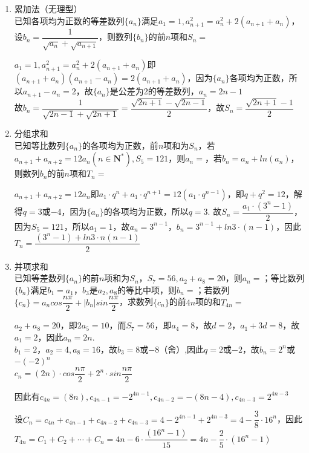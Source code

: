 \begin{enumerate}
    \item 累加法（无理型） \\
    已知各项均为正数的等差数列$\{a_n\}$满足$a_1 = 1, a_{n+1}^2 = a_n^2+2(a_{n+1} + a_n)$，设$b_n = \dfrac{1}{\sqrt{a_n} + \sqrt{a_{n+1}}}$，则数列$\{b_n\}$的前$n$项和$S_n = $
    \begin{jieda}
        $a_1 = 1, a_{n+1}^2 = a_n^2+2(a_{n+1} + a_n)$即$(a_{n+1} + a_n)(a_{n+1} - a_n) = 2(a_{n+1} + a_n)$，因为$\{a_n\}$各项均为正数，所以$a_{n+1} - a_n = 2$，故$\{a_n\}$是公差为2的等差数列，$a_n = 2n-1$ \\
        故$b_n = \dfrac{1}{\sqrt{2n-1} + \sqrt{2n+1}} = \dfrac{\sqrt{2n+1} - \sqrt{2n-1}}{2}$，故$S_n = \dfrac{\sqrt{2n+1} - 1}{2}$
    \end{jieda}
    
    \item 分组求和\\
    已知等比数列$\{a_n\}$的各项均为正数，前$n$项和为$S_n$，若$a_{n+1} + a_{n+2} = 12a_n(n \in \mathbf{N^*}), S_5 = 121$，则$a_n = $，若$b_n = a_n + ln (a_n)$，则数列$b_n$的前$n$项和$T_n = $
    \begin{jieda}
        $a_{n+1} + a_{n+2} = 12a_n$即$a_1 \cdot q^n + a_1 \cdot q^{n+1} = 12(a_1 \cdot q^{n-1})$，即$q + q^2 = 12$，解得$q = 3$或$-4$，因为$\{a_n\}$的各项均为正数，所以$q = 3$. 故$S_n = \dfrac{a_1 \cdot (3^n - 1)}{2}$，因为$S_5 = 121$，所以$a_1 = 1$，故$a_n = 3^{n-1}$，$b_n = 3^{n-1} + ln3 \cdot (n-1)$，因此$T_n = \dfrac{(3^n - 1) + ln3 \cdot n(n-1)}{2}$
    \end{jieda}
    \item 并项求和 \\
    已知等差数列$\{a_n\}$的前$n$项和为$S_n$，$S_7 = 56, a_2 + a_8 = 20$，则$a_n = $；等比数列$\{b_n\}$满足$b_1 = a_1$，$b_3$是$a_2, a_8$的等比中项，则$b_n = $；若数列$\{c_n\} = a_n cos\dfrac{n\pi}{2} + |b_n|sin\dfrac{n\pi}{2}$，求数列$\{c_n\}$的前$4n$项的和$T_{4n} = $
    \begin{jieda}
        $a_2 + a_8 = 20$，即$2a_5 = 10$，而$S_7 = 56$，即$a_4=8$，故$d = 2$，$a_1 + 3d = 8$，故$a_1 = 2$，因此$a_n = 2n$. \\
        $b_1 = 2$，$a_2 = 4, a_8 = 16$，故$b_3 = 8$或$-8$（舍）,因此$q = 2$或$-2$，故$b_n = 2^n$或$-(-2)^n$ \\
        $c_n = (2n) \cdot cos\dfrac{n\pi}{2} + 2^n \cdot sin\dfrac{n\pi}{2}$
        
        因此有$c_{4n} = (8n), c_{4n-1} = -2^{4n-1}, c_{4n-2} = -(8n-4), c_{4n-3} = 2^{4n-3}$
        
        设$C_n = c_{4n} + c_{4n-1} + c_{4n-2} + c_{4n-3} = 4 - 2^{4n-1} + 2^{4n-3} = 4 - \dfrac{3}{8} \cdot 16^n$，因此$T_{4n} = C_1 + C_2 + \cdots + C_n = 4n - 6 \cdot \dfrac{(16^n - 1)}{15} = 4n - \dfrac{2}{5} \cdot (16^n - 1)$
    \end{jieda}
\end{enumerate}
